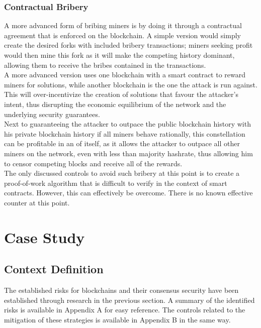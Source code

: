 \documentclass[12pt,a4paper]{article}
\begin{document}
\subsubsection{Contractual Bribery}

A more advanced form of bribing miners is by doing it through a contractual agreement that is enforced on the blockchain. A simple version would simply create the desired forks with included bribery \glspl{transaction}; miners seeking profit would then mine this fork as it will make the competing history dominant, allowing them to receive the bribes contained in the \glspl{transaction}.\\

A more advanced version uses one \gls{blockchain} with a smart contract to reward miners for solutions, while another \gls{blockchain} is the one the attack is run against. This will over-incentivize the creation of solutions that favour the attacker's intent, thus disrupting the economic equilibrium of the network and the underlying security guarantees.\\

Next to guaranteeing the attacker to outpace the public blockchain history with his private blockchain history if all miners behave rationally, this constellation can be profitable in an of itself, as it allows the attacker to outpace all other miners on the network, even with less than majority \gls{hashrate}, thus allowing him to censor competing blocks and receive all of the rewards.\\

The only discussed controls to avoid such bribery at this point is to create a proof-of-work algorithm that is difficult to verify in the context of smart contracts. However, this can effectively be overcome. There is no known effective counter at this point.\\

\section{Case Study}

\subsection{Context Definition}

The established risks for \gls{blockchain}s and their \gls{consensus} security have been established through research in the previous section. A summary of the identified risks is available in Appendix A for easy reference. The controls related to the mitigation of these strategies is available in Appendix B in the same way.\\
\end{document}
